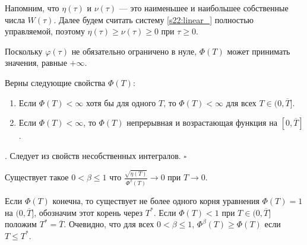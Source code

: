 \documentclass[../main.tex]{subfiles}
\begin{document}
Напомним, что $\eta(\tau)$ и $\nu(\tau)$ --- это наименьшее и наибольшее собственные числа $W(\tau)$. 
Далее будем считать систему \eqref{s22:linear_} полностью управляемой, поэтому $\eta(\tau) \geqslant \nu(\tau) \geqslant 0$ при $\tau \geq 0$.
 
Поскольку $\varphi(\tau)$ не обязательно ограничено в нуле, $\Phi(T)$ может принимать значения, равные $+\infty$.
\begin{lemma}%
Верны следующие свойства $\Phi(T)$:
\begin{enumerate}
 \item Если $\Phi(T) < \infty $ хотя бы для одного $T$, то $\Phi(T) < \infty $ для всех $T \in (0, \overline{T}]$.
\item Если $\Phi(T) < \infty $, то $\Phi(T)$ непрерывная и возрастающая функция на $ [0,\overline{T}]$.
 \end{enumerate}
\end{lemma}
\doc. 
Следует из свойств несобственных интегралов. \hfill $ \square $
\begin{assumption}\label{s22:asm2}
Существует такое $ 0 < \beta \leqslant 1$ что $\frac{\sqrt{\eta(T)}}{\Phi^\beta(T)} \to 0$ при $T \to 0$.
\end{assumption}
Если $\Phi(T)$ конечна, то существует не более одного корня уравнения $\Phi(T)=1$ на $(0,\overline{T}]$, обозначим этот корень через $T^*$.   
Если $\Phi(T)<1$ при $T\in (0,\overline{T}]$ положим $T^*=\overline{T}$. 
Очевидно, что для всех  $ 0 < \beta \leqslant 1$,   $\Phi^\beta(T)\geqslant \Phi(T)$ если $T \leqslant T^*$.
\end{document}
